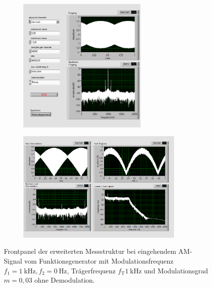\begin{figure}[H]
	\centering
	\begin{subfigure}[c]{\textwidth}
		\centering
		\includegraphics[width=0.7\textwidth]{pic/dam_betrag1.png}
	\end{subfigure}
	\begin{subfigure}[c]{\textwidth}
		\centering
		\includegraphics[width=0.9\textwidth]{pic/dam_betrag2.png}
	\end{subfigure}	
	\caption{Frontpanel der erweiterten Messstruktur bei eingehendem AM-Signal vom Funktionsgenerator mit Modulationsfrequenz $f_1= \SI{1}{\kilo\hertz}, f_2 = \SI{0}{\hertz}$, Trägerfrequenz $f_\text{T}\SI{1}{\kilo\hertz}$ und Modulationsgrad $m = 0,03$ ohne Demodulation.}
	\label{fig:dam_betrag}	
\end{figure} 
